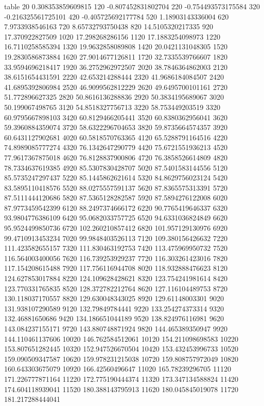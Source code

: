 table {%
20 0.308353859609815
120 -0.807452831802704
220 -0.754493573175584
320 -0.216325561725101
420 -0.405725692177784
520 1.18903143336004
620 7.9733938546163
720 8.65732793750438
820 14.5105320217335
920 17.370922827509
1020 17.298268286156
1120 17.1883254098973
1220 16.7110258585394
1320 19.9632858089808
1420 20.0421131048305
1520 19.2830586873884
1620 27.9014677126811
1720 32.7335539766607
1820 33.9594696218417
1920 36.2752962972507
2020 38.7846364862003
2120 38.6151654431591
2220 42.653214288444
2320 41.9686184084507
2420 41.6895392806984
2520 46.9099562812229
2620 49.6495700101161
2720 51.772896627325
2820 50.8616136288836
2920 50.3834195689067
3020 50.199067498765
3120 54.8518327756713
3220 58.753449203519
3320 60.9795667898103
3420 60.8129466205441
3520 60.8380362956041
3620 59.3960884359074
3720 58.6322296704653
3820 59.8735664574357
3920 60.6431127902681
4020 60.5818570763365
4120 65.5288791164516
4220 74.8989085777274
4320 76.1342647290779
4420 75.6721551936213
4520 77.9617367875018
4620 76.8128837900806
4720 76.3858526614809
4820 78.7334637619385
4920 85.5307830428707
5020 87.5401583144556
5120 85.5735247297437
5220 85.1445862621614
5320 84.8629756023124
5420 83.5895110418576
5520 88.0275557591137
5620 87.8365575313391
5720 87.5111444120686
5820 87.5365128282587
5920 87.5894276122008
6020 87.9773459542399
6120 88.2497374666172
6220 90.7765419646337
6320 93.9804776386109
6420 95.0682033757725
6520 94.6331036824849
6620 95.9524499850736
6720 102.260210857412
6820 101.957129130976
6920 99.4710913453234
7020 99.9848403526113
7120 109.380156426632
7220 111.423582655157
7320 111.830463192753
7420 113.475969950732
7520 116.564003400056
7620 116.739253929237
7720 116.303261423016
7820 117.154208615488
7920 117.756116944708
8020 118.932888476623
8120 124.627853017884
8220 124.109628428621
8320 123.754241981614
8420 123.770331765835
8520 128.372782212764
8620 127.116104489753
8720 130.118037170557
8820 129.630048343025
8920 129.61148003301
9020 131.938107290589
9120 132.79849784441
9220 133.254274373314
9320 132.46881650686
9420 134.186651044189
9520 138.824976116981
9620 143.084237155171
9720 143.880748871924
9820 144.465389350947
9920 144.110461137606
10020 146.762584512061
10120 154.211098698583
10220 153.807651282445
10320 152.947526670504
10420 153.432453996733
10520 159.090509347587
10620 159.978231215038
10720 159.808757972049
10820 160.643303675079
10920 166.42560496647
11020 165.78239296705
11120 171.226777871164
11220 172.775190444374
11320 173.347134588824
11420 174.604118939041
11520 180.388143795913
11620 180.045845019078
11720 181.217288444041
}
